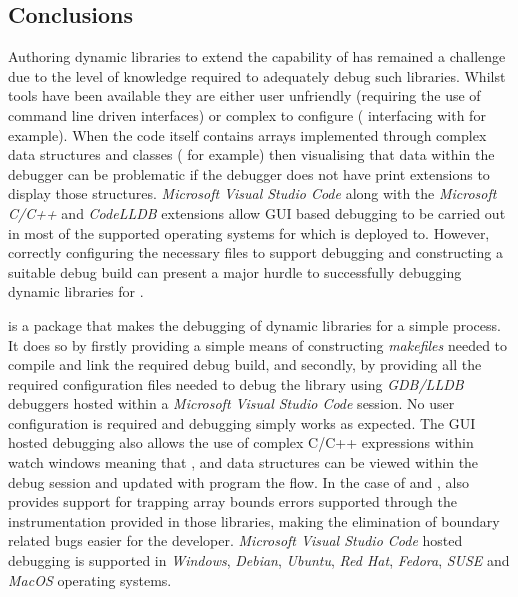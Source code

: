 \hypertarget{Conclusions}{%
\subsection{Conclusions}
\label{Conclusions}}

Authoring dynamic libraries to extend the capability of  has remained a challenge due to the level of knowledge required to adequately debug such libraries.
Whilst tools have been available they are either user unfriendly (requiring the use of command line driven interfaces) or complex to configure ( interfacing with  
for example). When the code itself contains arrays implemented through complex data structures and classes ( for example) then visualising that data within the 
debugger can be problematic if the debugger does not have print extensions to display those structures. \emph{Microsoft Visual Studio Code} along with the \emph{Microsoft C/C++}
and \emph{CodeLLDB} extensions allow GUI based debugging to be carried out in most of the supported operating systems for which  is deployed to. However, correctly 
configuring the necessary files to support debugging and constructing a suitable debug build can present a major hurdle to successfully debugging dynamic libraries for .

 is a package that makes the debugging of dynamic libraries for  a simple process. It does so by firstly providing a simple means of constructing 
\emph{makefiles} needed to compile and link the required debug build, and secondly, by providing all the required configuration files needed to debug the library using \emph{GDB/LLDB} debuggers 
hosted within a \emph{Microsoft Visual Studio Code} session. No user configuration is required and debugging simply works as expected. The GUI hosted debugging also allows 
the use of complex C/C++ expressions within watch windows meaning that ,  and  data structures can be viewed within the debug session and 
updated with program the flow. In the case of  and ,  also provides support for trapping array bounds errors supported through the instrumentation
provided in those libraries, making the elimination of boundary related bugs easier for the developer. \emph{Microsoft Visual Studio Code} hosted debugging is supported in 
\emph{Windows}, \emph{Debian}, \emph{Ubuntu}, \emph{Red Hat}, \emph{Fedora}, \emph{SUSE} and \emph{MacOS} operating systems.

